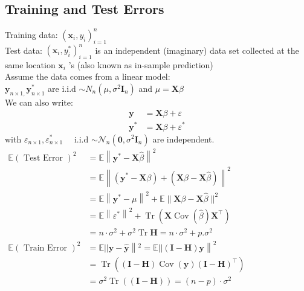 \documentclass[11pt,a4paper]{article}
\begin{document}
\subsection{ Training and Test Errors}
Training data: $\left(\mathbf{x}_{i}, y_{i}\right)_{i=1}^{n}$\\
Test data: $\left(\mathbf{x}_{i}, y_{i}^{*}\right)_{i=1}^{n}$ is an independent (imaginary) data set collected at the same location $\mathbf{x}_{i}$ 's (also known as in-sample prediction)\\
Assume the data comes from a linear model:\\
$\mathbf{y}_{n \times 1,} \mathbf{y}_{n \times 1}^{*}$ are i.i.d $\sim N_{n}\left(\mu, \sigma^{2} \mathbf{I}_{n}\right)$ and $\mu=\mathbf{X} \beta$\\
We can also write:
$$
\begin{aligned}
\mathbf{y} &=\mathbf{X} \beta+\varepsilon \\
\mathbf{y}^{*} &=\mathbf{X} \beta+\varepsilon^{*}
\end{aligned}
$$
with $\varepsilon_{n \times 1}, \varepsilon_{n \times 1}^{*} \quad$ i.i.d $\sim \mathcal{N}_{n}\left(\mathbf{0}, \sigma^{2} \mathbf{I}_{n}\right)$ are independent.\\

$\begin{aligned} \mathbb{E}(\text { Test Error })^{2} &=\mathbb{E}\left\|\mathbf{y}^{*}-\mathbf{X} \hat{\beta}\right\|^{2} \\ &=\mathbb{E}\left\|\left(\mathbf{y}^{*}-\mathbf{X} \beta\right)+(\mathbf{X} \beta-\mathbf{X} \hat{\beta})\right\|^{2} \\ &=\mathbb{E}\left\|\mathbf{y}^{*}-\mu\right\|^{2}+\mathbb{E}\|\mathbf{X} \beta-\mathbf{X} \hat{\beta}\|^{2} \\ &=\mathbb{E}\left\|\varepsilon^{*}\right\|^{2}+\operatorname{Tr}\left(\mathbf{X} \operatorname{Cov}(\hat{\beta}) \mathbf{X}^{\top}\right) \\ &=n \cdot \sigma^{2}+\sigma^{2} \operatorname{Tr} \mathbf{H}=n \cdot \sigma^{2}+p . \sigma^{2} \\ \mathbb{E}(\text { Train Error })^{2} &=\mathbb{E}|| \mathbf{y}-\hat{\mathbf{y}}\left\|^{2}=\mathbb{E}||(\mathbf{I}-\mathbf{H}) \mathbf{y}\right\|^{2} \\ &=\operatorname{Tr}\left((\mathbf{I}-\mathbf{H}) \operatorname{Cov}(\mathbf{y})(\mathbf{I}-\mathbf{H})^{\top}\right) \\ &=\sigma^{2} \operatorname{Tr}((\mathbf{I}-\mathbf{H}))=(n-p) \cdot \sigma^{2} \end{aligned}$
\end{document}
